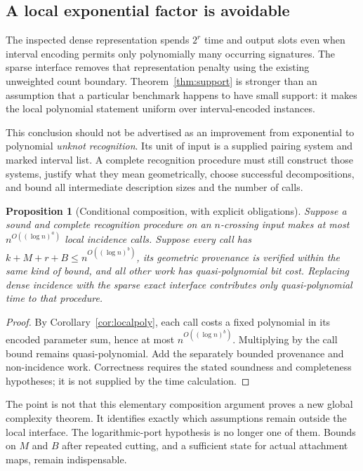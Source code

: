 \documentclass[11pt]{article}
\newtheorem{proposition}[theorem]{Proposition}
\theoremstyle{definition}
\begin{document}
\subsection{A local exponential factor is avoidable}
The inspected dense representation spends $2^r$ time and output slots even
when interval encoding permits only polynomially many occurring signatures.
The sparse interface removes that representation penalty using the existing
unweighted count boundary. Theorem~\ref{thm:support} is stronger than an
assumption that a particular benchmark happens to have small support:
it makes the local polynomial statement uniform over interval-encoded
instances.

This conclusion should not be advertised as an improvement from exponential
to polynomial \emph{unknot recognition}. Its unit of input is a supplied
pairing system and marked interval list. A complete recognition procedure
must still construct those systems, justify what they mean geometrically,
choose successful decompositions, and bound all intermediate description
sizes and the number of calls.

\begin{proposition}[Conditional composition, with explicit obligations]
Suppose a sound and complete recognition procedure on an $n$-crossing input
makes at most $n^{O((\log n)^a)}$ local incidence calls. Suppose every call
has $k+M+r+B\leq n^{O((\log n)^b)}$, its geometric provenance is verified
within the same kind of bound, and all other work has quasi-polynomial bit
cost. Replacing dense incidence with the sparse exact interface contributes
only quasi-polynomial time to that procedure.
\end{proposition}
\begin{proof}
By Corollary~\ref{cor:localpoly}, each call costs a fixed polynomial in its
encoded parameter sum, hence at most $n^{O((\log n)^b)}$. Multiplying by
the call bound remains quasi-polynomial. Add the separately bounded
provenance and non-incidence work. Correctness requires the stated soundness
and completeness hypotheses; it is not supplied by the time calculation.
\end{proof}

The point is not that this elementary composition argument proves a new
global complexity theorem. It identifies exactly which assumptions remain
outside the local interface. The logarithmic-port hypothesis is no longer
one of them. Bounds on $M$ and $B$ after repeated cutting, and a sufficient
state for actual attachment maps, remain indispensable.
\end{document}

